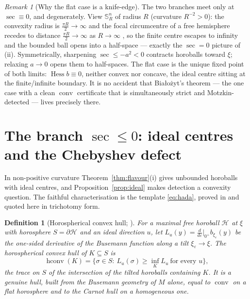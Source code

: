 \documentclass[11pt]{article}
\newtheorem{definition}[theorem]{Definition}
\theoremstyle{remark}
\newtheorem{remark}[theorem]{Remark}
\newcommand{\Hb}[1]{\mathcal{H}_{#1}}
\newcommand{\conv}{\operatorname{conv}}
\newcommand{\hconv}{\operatorname{hconv}}
\newcommand{\sect}{\operatorname{sec}}
\newcommand{\Hess}{\operatorname{Hess}}
\newcommand{\Sn}{\mathbb{S}^{n}}
\begin{document}
\begin{remark}[Why the flat case is a knife-edge]\label{rem:knife}
The two branches meet only at $\sect\equiv0$, and degenerately. View
$\Sn_{R}$ of radius $R$ (curvature $R^{-2}>0$): the convexity radius is
$\tfrac{\pi R}{2}\to\infty$ and the focal circumcentre of a free hemisphere
recedes to distance $\tfrac{\pi R}{2}\to\infty$ as $R\to\infty$
\cite[Rem.~3.2]{Sph}, so the finite centre escapes to infinity and the
bounded ball opens into a half-space --- exactly the $\sect=0$ picture of
(ii). Symmetrically, sharpening $\sect\le-a^{2}<0$ contracts horoballs
toward $\xi$; relaxing $a\to0$ opens them to half-spaces. The flat case is
the unique fixed point of both limits: $\Hess b\equiv0$, neither convex nor
concave, the ideal centre sitting at the finite/infinite boundary. It is no
accident that Bia\l{}o\.zyt's theorem --- the one case with a clean
$\conv$ certificate that is simultaneously strict and Motzkin-detected ---
lives precisely there.
\end{remark}

\section{The branch $\sect\le0$: ideal centres and the Chebyshev defect}
\label{sec:neg}

In non-positive curvature Theorem~\ref{thm:flavour}(i) gives unbounded
horoballs with ideal centres, and Proposition~\ref{prop:ideal} makes
detection a convexity question. The faithful characterisation is the
template \eqref{eq:hada}, proved in \cite{R3} and quoted here in
trichotomy form.

\begin{definition}[Horospherical convex hull; {\cite[Def.~3.1]{R3}}]
\label{def:hconv}
For a maximal free horoball $\Hb{}$ at $\xi$ with horosphere
$S=\partial\Hb{}$ and an ideal direction $u$, let $L_{u}(y)=\frac{d}{d
\varepsilon}\big|_{0^{+}}b_{\xi_{\varepsilon}}(y)$ be the one-sided
derivative of the Busemann function along a tilt $\xi_{\varepsilon}\to\xi$.
The \emph{horospherical convex hull} of $K\subseteq S$ is
\[
  \hconv(K)=\bigl\{\sigma\in S:\ L_{u}(\sigma)\ge\textstyle\inf_{K}L_{u}
  \ \text{for every }u\bigr\},
\]
the trace on $S$ of the intersection of the tilted horoballs containing
$K$. It is a genuine hull, built from the Busemann geometry of $M$ alone,
equal to $\conv$ on a flat horosphere and to the Carnot hull on a
homogeneous one.
\end{definition}
\end{document}

